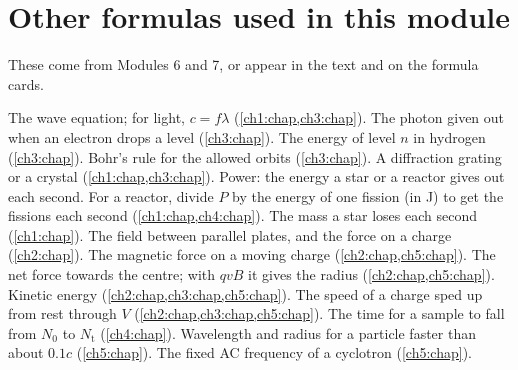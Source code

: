 \section*{Other formulas used in this module}
These come from Modules 6 and 7, or appear in the text and on the formula cards.
\begin{formulatable}
    {The wave equation; for light, $c = f\lambda$ (\cref{ch1:chap,ch3:chap}).}
    {The photon given out when an electron drops a level (\cref{ch3:chap}).}
    {The energy of level $n$ in hydrogen (\cref{ch3:chap}).}
    {Bohr's rule for the allowed orbits (\cref{ch3:chap}).}
    {A diffraction grating or a crystal (\cref{ch1:chap,ch3:chap}).}
    {Power: the energy a star or a reactor gives out each second. For a reactor, divide
     $P$ by the energy of one fission (in J) to get the fissions each second
     (\cref{ch1:chap,ch4:chap}).}
    {The mass a star loses each second (\cref{ch1:chap}).}
    {The field between parallel plates, and the force on a charge (\cref{ch2:chap}).}
    {The magnetic force on a moving charge (\cref{ch2:chap,ch5:chap}).}
    {The net force towards the centre; with $qvB$ it gives the radius
     (\cref{ch2:chap,ch5:chap}).}
    {Kinetic energy (\cref{ch2:chap,ch3:chap,ch5:chap}).}
    {The speed of a charge sped up from rest through $V$
     (\cref{ch2:chap,ch3:chap,ch5:chap}).}
    {The time for a sample to fall from $N_0$ to $N_\mathrm{t}$ (\cref{ch4:chap}).}
    {Wavelength and radius for a particle faster than about $0.1c$ (\cref{ch5:chap}).}
    {The fixed AC frequency of a cyclotron (\cref{ch5:chap}).}
\end{formulatable}

